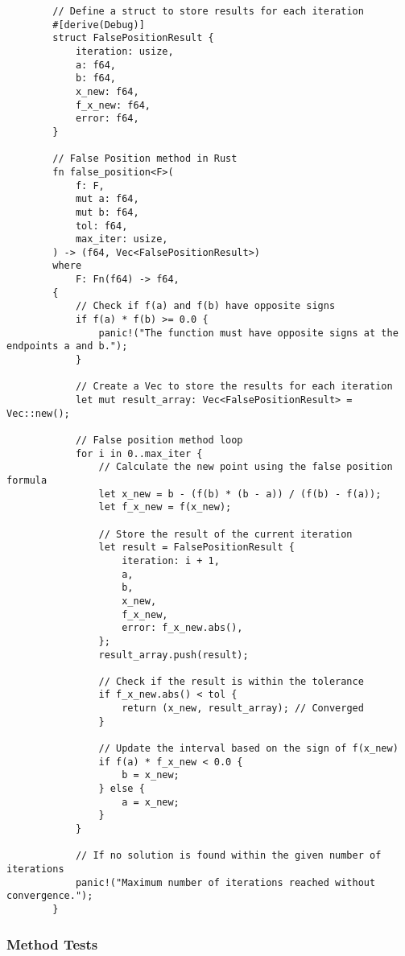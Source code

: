 \documentclass{article}
\begin{document}
     \begin{verbatim}
        // Define a struct to store results for each iteration
        #[derive(Debug)]
        struct FalsePositionResult {
            iteration: usize,
            a: f64,
            b: f64,
            x_new: f64,
            f_x_new: f64,
            error: f64,
        }

        // False Position method in Rust
        fn false_position<F>(
            f: F,
            mut a: f64,
            mut b: f64,
            tol: f64,
            max_iter: usize,
        ) -> (f64, Vec<FalsePositionResult>)
        where
            F: Fn(f64) -> f64,
        {
            // Check if f(a) and f(b) have opposite signs
            if f(a) * f(b) >= 0.0 {
                panic!("The function must have opposite signs at the endpoints a and b.");
            }

            // Create a Vec to store the results for each iteration
            let mut result_array: Vec<FalsePositionResult> = Vec::new();

            // False position method loop
            for i in 0..max_iter {
                // Calculate the new point using the false position formula
                let x_new = b - (f(b) * (b - a)) / (f(b) - f(a));
                let f_x_new = f(x_new);

                // Store the result of the current iteration
                let result = FalsePositionResult {
                    iteration: i + 1,
                    a,
                    b,
                    x_new,
                    f_x_new,
                    error: f_x_new.abs(),
                };
                result_array.push(result);

                // Check if the result is within the tolerance
                if f_x_new.abs() < tol {
                    return (x_new, result_array); // Converged
                }

                // Update the interval based on the sign of f(x_new)
                if f(a) * f_x_new < 0.0 {
                    b = x_new;
                } else {
                    a = x_new;
                }
            }

            // If no solution is found within the given number of iterations
            panic!("Maximum number of iterations reached without convergence.");
        }
     \end{verbatim}
    \subsubsection{Method Tests}
\end{document}
